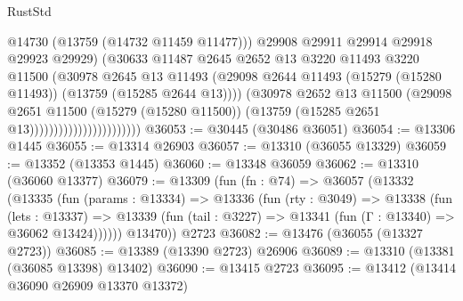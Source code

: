 \begin{lexlean}{RustStd}
\begin{coremodule}
                                            @14730
                                            (@13759 (@14732 @11459 @11477)))
                                          @29908
                                          @29911
                                          @29914
                                          @29918
                                          @29923
                                          @29929)
                                        (@30633
                                          @11487
                                          @2645
                                          @2652
                                          @13
                                          @3220
                                          @11493
                                          @3220
                                          @11500
                                          (@30978
                                            @2645
                                            @13
                                            @11493
                                            (@29098
                                              @2644
                                              @11493
                                              (@15279 (@15280 @11493))
                                              (@13759 (@15285 @2644 @13))))
                                          (@30978
                                            @2652
                                            @13
                                            @11500
                                            (@29098
                                              @2651
                                              @11500
                                              (@15279 (@15280 @11500))
                                              (@13759 (@15285 @2651 @13)))))))))))))))))))))))
@36053 := @30445 (@30486 @36051)
@36054 := @13306 @1445
@36055 := @13314 @26903
@36057 := @13310 (@36055 @13329)
@36059 := @13352 (@13353 @1445)
@36060 := @13348 @36059
@36062 := @13310 (@36060 @13377)
@36079 := @13309
    (fun (fn : @74) =>
    @36057
      (@13332
        (@13335
          (fun (params : @13334) =>
          @13336
            (fun (rty : @3049) =>
            @13338
              (fun (lets : @13337) =>
              @13339 (fun (tail : @3227) => @13341 (fun (Γ : @13340) => @36062 @13424))))))
        @13470))
    @2723
@36082 := @13476 (@36055 (@13327 @2723))
@36085 := @13389 (@13390 @2723) @26906
@36089 := @13310 (@13381 (@36085 @13398) @13402)
@36090 := @13415 @2723
@36095 := @13412 (@13414 @36090 @26909 @13370 @13372)

\end{coremodule}
\end{lexlean}
